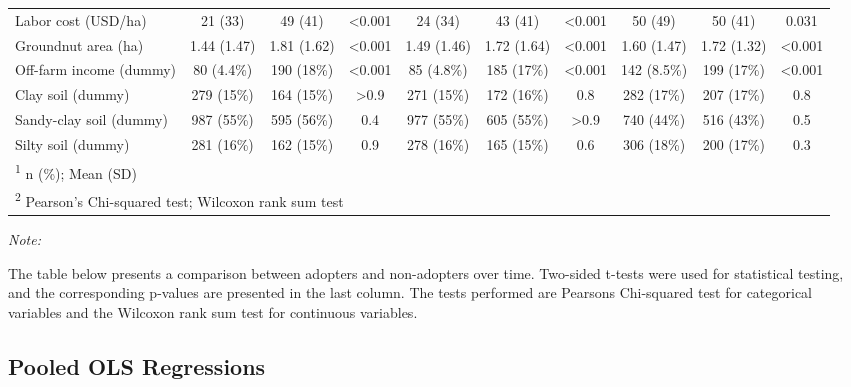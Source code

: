 \documentclass[
]{article}
\begin{document}
\begin{landscape}
\begin{table}[!h]
{\begin{threeparttable}
\begin{tabular}[t]{lccccccccc}
\addlinespace
Labor cost (USD/ha) & 21 (33) & 49 (41) & <0.001 & 24 (34) & 43 (41) & <0.001 & 50 (49) & 50 (41) & 0.031\\
Groundnut area (ha) & 1.44 (1.47) & 1.81 (1.62) & <0.001 & 1.49 (1.46) & 1.72 (1.64) & <0.001 & 1.60 (1.47) & 1.72 (1.32) & <0.001\\
Off-farm income (dummy) & 80 (4.4\%) & 190 (18\%) & <0.001 & 85 (4.8\%) & 185 (17\%) & <0.001 & 142 (8.5\%) & 199 (17\%) & <0.001\\
Clay soil (dummy) & 279 (15\%) & 164 (15\%) & >0.9 & 271 (15\%) & 172 (16\%) & 0.8 & 282 (17\%) & 207 (17\%) & 0.8\\
Sandy-clay soil (dummy) & 987 (55\%) & 595 (56\%) & 0.4 & 977 (55\%) & 605 (55\%) & >0.9 & 740 (44\%) & 516 (43\%) & 0.5\\
\addlinespace
Silty soil (dummy) & 281 (16\%) & 162 (15\%) & 0.9 & 278 (16\%) & 165 (15\%) & 0.6 & 306 (18\%) & 200 (17\%) & 0.3\\
\bottomrule
\multicolumn{10}{l}{\rule{0pt}{1em}\textsuperscript{1} n (\%); Mean (SD)}\\
\multicolumn{10}{l}{\rule{0pt}{1em}\textsuperscript{2} Pearson's Chi-squared test; Wilcoxon rank sum test}\\
\end{tabular}
\begin{tablenotes}[para]
\item \textit{Note: } 
\item The table below presents a comparison between adopters and non-adopters over time. Two-sided t-tests were used for statistical testing, and the corresponding p-values are presented in the last column. The tests performed are Pearsons Chi-squared test for categorical variables and the Wilcoxon rank sum test for continuous variables.
\end{tablenotes}
\end{threeparttable}}
\end{table}
\end{landscape}
\newpage

\hypertarget{pooled-ols-regressions}{%
\subsection{Pooled OLS Regressions}\label{pooled-ols-regressions}}

\begingroup\fontsize{7}{9}\selectfont
\end{document}
